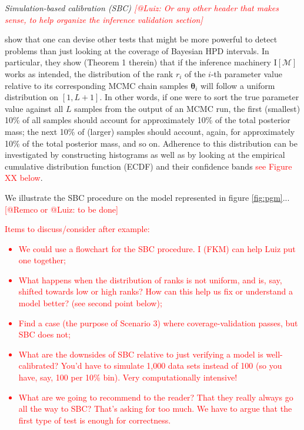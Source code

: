 \documentclass[oneside]{article}
\begin{document}
\vspace{.25cm}

\noindent \emph{Simulation-based calibration (SBC) \textcolor{red}{[@Luiz: Or any other
    header that makes sense, to help organize the inference validation section]}}

\cite{Talts2018} show that one can devise other tests that might be
more powerful to detect problems than just looking at the coverage of
Bayesian HPD intervals.
In particular, they show (Theorem 1 therein) that if the inference machinery
$\text{I}[\mathcal{M}]$ works as intended, the distribution of the rank
$r_i$ of the $i$-th parameter value relative to its corresponding MCMC chain samples $\boldsymbol{\theta}_i$ will follow a uniform distribution on $[1, L + 1]$.
In other words, if one were to sort the true parameter value against all $L$ samples from the output of an MCMC run, the first (smallest) 10\% of all samples should account for approximately 10\% of the total posterior mass; the next 10\% of (larger) samples should account, again, for approximately 10\% of the total posterior mass, and so on.
Adherence to this distribution can be investigated by constructing histograms \citep{Talts2018} as well as by looking at the empirical cumulative distribution function (ECDF) and their confidence bands \citep{Sailynoja2021} \textcolor{red}{see Figure XX below}.

We illustrate the SBC procedure on the model represented in figure
\ref{fig:pgm}... \textcolor{red}{[@Remco or @Luiz: to be done]}

\textcolor{red}{
  Items to discuss/consider after example:
  \begin{itemize}
  \item We could use a flowchart for the SBC procedure. I (FKM) can
    help Luiz put one together; 
  \item What happens when the distribution of ranks is not uniform,
    and is, say, shifted towards low or high ranks? How can this help
    us fix or understand a model better? (see second point below);
  \item Find a case (the purpose of Scenario 3) where
    coverage-validation passes, but SBC does not;
  \item What are the downsides of SBC relative to just verifying
    a model is well-calibrated? You'd have to simulate 1,000
    data sets instead of 100 (so you have, say, 100 per 10\% bin).
    Very computationally intensive!
  \item What are we going to recommend to the reader? That they
    really always go all the way to SBC? That's asking for too much.
    We have to argue that the first type of test is enough for
    correctness.
  \end{itemize}
}
\end{document}
